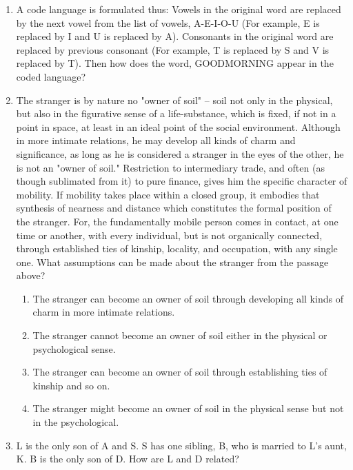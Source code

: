 \documentclass[12pt]{article}
\theoremstyle{remark}
\begin{document}
\begin{enumerate}
\hfill{}
\item  A code language is formulated thus:
\vspace{1mm}
Vowels in the original word are replaced by the next vowel from the list of vowels, A-E-I-O-U (For example, E is replaced by I and U is replaced by A). Consonants in the original word are replaced by previous consonant (For example, T is replaced by S and V is replaced by T).
\vspace{1mm}
Then how does the word, GOODMORNING appear in the coded language? 
\begin{enumerate}  \end{enumerate}

\hfill{}
\item  The stranger is by nature no "owner of soil" -- soil not only in the physical, but also in the figurative sense of a life-substance, which is fixed, if not in a point in space, at least in an ideal point of the social environment. Although in more intimate relations, he may develop all kinds of charm and significance, as long as he is considered a stranger in the eyes of the other, he is not an "owner of soil." 
\newline
Restriction to intermediary trade, and often (as though sublimated from it) to pure finance, gives him the specific character of mobility. If mobility takes place within a closed group, it embodies that synthesis of nearness and distance which constitutes the formal position of the stranger. For, the fundamentally mobile person comes in contact, at one time or another, with every individual, but is not organically connected, through established ties of kinship, locality, and occupation, with any single one.
\vspace{1mm}
What assumptions can be made about the stranger from the passage above? \\
\begin{enumerate} 
\item   The stranger can become an owner of soil through developing all kinds of charm in more intimate relations. 
\item   The stranger cannot become an owner of soil either in the physical or psychological sense. 
\item   The stranger can become an owner of soil through establishing ties of kinship and so on.
\item   The stranger might become an owner of soil in the physical sense but not in the psychological. 
\end{enumerate}
\hfill{}
\item L is the only son of A and S. S has one sibling, B, who is married to L’s aunt, K. B is the only son of D. How are L and D related?
\vspace{1mm}


\end{enumerate}
\end{document}
